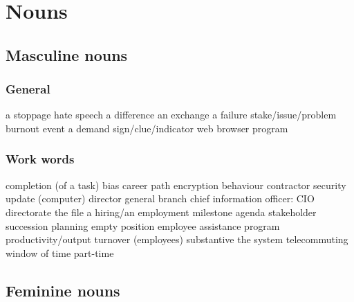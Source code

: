 \section{Nouns}
\subsection*{Masculine nouns}
\subsubsection*{General}
   {a stoppage}
   {hate speech}
   {a difference}
   {an exchange}
   {a failure}
   {stake/issue/problem}
 {burnout}
   {event}
   {a demand}
   {sign/clue/indicator}
   {web browser}
   {program}
\subsubsection*{Work words}
   {completion (of a task)}
   {bias}
   {career path}
   {encryption}
   {behaviour}
   {contractor}
   {security update (computer)}
   {director general}
   {branch}
   {chief information officer: CIO}
   {directorate}
   {the file}
   {a hiring/an employment}
   {milestone}
   {agenda}
   {stakeholder}
   {succession planning}
   {empty position}
   {employee assistance program}
   {productivity/output}
   {turnover (employees)}
   {substantive}
   {the system}
   {telecommuting}
   {window of time}
   {part-time}
\subsection*{Feminine nouns}
